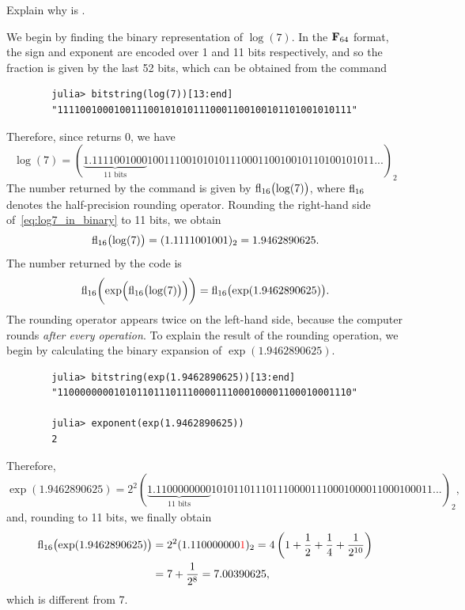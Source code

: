 \begin{exercise}
    Explain why  is .
\end{exercise}
\begin{solution}
    We begin by finding the binary representation of $\log(7)$.
    In the $\mathbf F_{64}$ format, the sign and exponent are encoded over 1 and 11 bits respectively,
    and so the fraction is given by the last 52 bits, which can be obtained from the command
    \begin{verbatim}
        julia> bitstring(log(7))[13:end]
        "1111001000100111001010101110001100100101101001010111"
    \end{verbatim}
    Therefore, since  returns 0, we have
    \begin{equation}
        \label{eq:log7_in_binary}
        \log(7) = (\underbrace{1.1111001000}_{\text{11 bits}}10011100101010111000110010010110100101011...)_2
    \end{equation}
    The number returned by the command 
    is given by ${\rm fl}_{16}\bigl(\log(7)\bigr)$,
    where ${\rm fl}_{16}$ denotes the half-precision rounding operator.
    Rounding the right-hand side of~\eqref{eq:log7_in_binary} to 11 bits, we obtain
    \[
        {\rm fl}_{16}\bigl(\log(7)\bigr) = (1.1111001001)_2 = 1.9462890625.
    \]
    The number returned by the code  is
    \[
        {\rm fl}_{16} \biggl( \exp\Bigl({\rm fl}_{16}\bigl(\log(7)\bigr)\Bigr) \biggr)
        = {\rm fl}_{16} \bigl( \exp (1.9462890625)  \bigr).
    \]
    The rounding operator appears twice on the left-hand side,
    because the computer rounds \emph{after every operation}.
    To explain the result of the rounding operation,
    we begin by calculating the binary expansion of $\exp(1.9462890625)$.
    \begin{verbatim}
        julia> bitstring(exp(1.9462890625))[13:end]
        "1100000000101011011101110000111000100001100010001110"

        julia> exponent(exp(1.9462890625))
        2
    \end{verbatim}
    Therefore,
    \[
        \exp(1.9462890625)
        = 2^2 (\underbrace{1.1100000000}_{\text{11 bits}}1010110111011100001110001000011000100011...)_2,
    \]
    and, rounding to 11 bits,
    we finally obtain
    \begin{align*}
        {\rm fl}_{16} \bigl( \exp (1.9462890625) \bigr)
        &= 2^2 (1.110000000\textcolor{red}{1})_2 = 4 \left(1 + \frac{1}{2} + \frac{1}{4} + \frac{1}{2^{10}}\right) \\
        &= 7 + \frac{1}{2^8} = 7.00390625,
    \end{align*}
    which is different from 7.
\end{solution}

